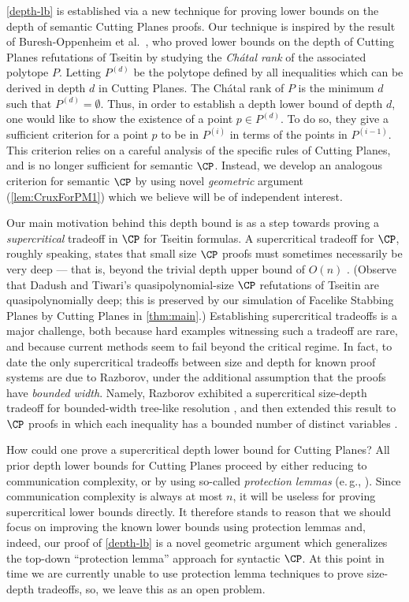 \documentclass[11pt]{article}
\numberwithin{equation}{section}
\theoremstyle{definition}
\theoremstyle{plain}
\newcommand{\eg}{e.\,g.}
\begin{document}
\autoref{depth-lb} is established via a new technique for proving lower bounds on the depth of semantic Cutting Planes proofs. Our technique is inspired by the result of Buresh-Oppenheim et al.~\cite{BGHMP06}, who proved lower bounds on the depth of Cutting Planes refutations of Tseitin by studying the \emph{Ch\'{a}tal rank} of the associated polytope $P$. Letting $P^{(d)}$ be the polytope %
defined by %
all inequalities which can be derived in depth $d$ in Cutting Planes. The Ch\'{a}tal rank of $P$ is the minimum $d$ such that $P^{(d)}=\emptyset$. Thus, in order to establish a depth lower bound of depth $d$, one would like to show the existence of a point $p \in P^{(d)}$. To do so, they give a sufficient criterion for a point $p$ to be in $P^{(i)}$ in terms of the points in $P^{(i-1)}$. This criterion relies on a careful analysis of the specific rules of Cutting Planes, and is no longer sufficient for semantic $\CP$. Instead, we develop an analogous criterion for semantic $\CP$ by using novel \emph{geometric} argument (\autoref{lem:CruxForPM1}) which we believe will be of independent interest. 


%
Our main motivation behind this depth bound is as a step towards proving a \emph{supercritical} tradeoff in $\CP$ for Tseitin formulas.
A supercritical tradeoff for $\CP$, roughly speaking, states that small size $\CP$ proofs must sometimes necessarily be very deep --- that is, beyond the trivial depth upper bound of $O(n)$ \cite{Razborov16,BerkholzN20}.
(Observe that Dadush and Tiwari's quasipolynomial-size $\CP$ refutations of Tseitin are quasipolynomially deep; this is preserved by our simulation of Facelike Stabbing Planes by Cutting Planes in \autoref{thm:main}.)
Establishing supercritical tradeoffs is a major challenge, both because
hard examples witnessing such a tradeoff are rare, and because current methods seem to fail beyond the critical regime.
In fact, to date the only supercritical tradeoffs between size and depth for known proof systems are due to Razborov, under the additional assumption that the proofs have \emph{bounded width}.
Namely, Razborov exhibited a supercritical size-depth tradeoff for
%
bounded-width    %
tree-like resolution \cite{Razborov16}, and then extended this result to $\CP$ proofs in which each inequality has a bounded number of distinct variables \cite{Razborov17}.

How could one prove a supercritical depth lower bound for Cutting Planes?
All prior depth lower bounds for Cutting Planes proceed by either reducing to communication complexity, or by using so-called \emph{protection lemmas} (\eg, \cite{BGHMP06}).
Since communication complexity is always at most $n$, it will be useless for proving supercritical lower bounds directly.
It therefore stands to reason that we should focus on improving the known lower bounds using protection lemmas and, indeed, our proof of \autoref{depth-lb} is a novel geometric argument which generalizes the top-down ``protection lemma'' approach \cite{BGHMP06} for syntactic $\CP$.
At this point in time we are currently unable to use protection lemma techniques to prove size-depth tradeoffs, so, we leave this as an open problem.
\end{document}
